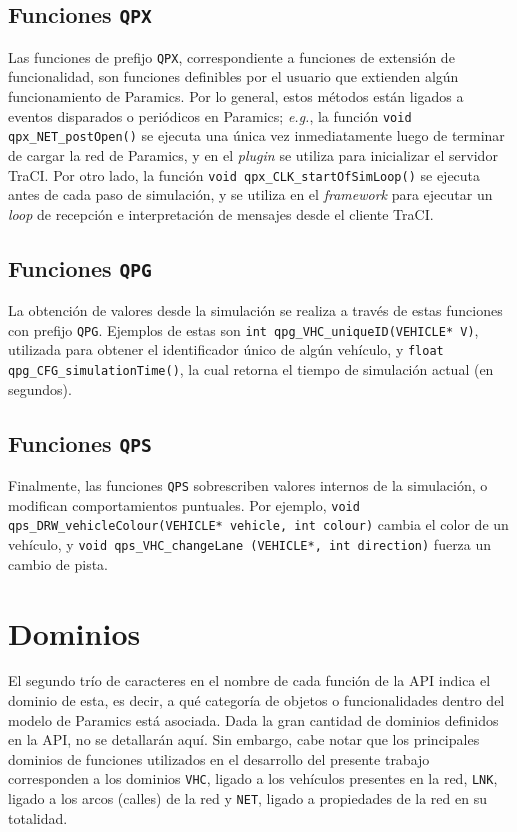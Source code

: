 \subsection{Funciones \texttt{QPX}}

Las funciones de prefijo \texttt{QPX}, correspondiente a funciones de extensión de funcionalidad, son funciones definibles por el usuario que extienden algún funcionamiento de Paramics. Por lo general, estos métodos están ligados a eventos disparados o periódicos en Paramics; \emph{e.g.}, la función \texttt{void qpx\_NET\_postOpen()} se ejecuta una única vez inmediatamente luego de terminar de cargar la red de Paramics, y en el \emph{plugin} se utiliza para inicializar el servidor TraCI. Por otro lado, la función \texttt{void qpx\_CLK\_startOfSimLoop()} se ejecuta antes de cada paso de simulación, y se utiliza en el \emph{framework} para ejecutar un \emph{loop} de recepción e interpretación de mensajes desde el cliente TraCI.

\subsection{Funciones \texttt{QPG}}

La obtención de valores desde la simulación se realiza a través de estas funciones con prefijo \texttt{QPG}. Ejemplos de estas son \texttt{int qpg\_VHC\_uniqueID(VEHICLE* V)}, utilizada para obtener el identificador único de algún vehículo, y \texttt{float qpg\_CFG\_simulationTime()}, la cual retorna el tiempo de simulación actual (en segundos).

\subsection{Funciones \texttt{QPS}}

Finalmente, las funciones \texttt{QPS} sobrescriben valores internos de la simulación, o modifican comportamientos puntuales. Por ejemplo, \texttt{void qps\_DRW\_vehicleColour(VEHICLE* vehicle, int colour)} cambia el color de un vehículo, y \texttt{void qps\_VHC\_changeLane (VEHICLE*, int direction)} fuerza un cambio de pista.
\newpage
\section{Dominios}

El segundo trío de caracteres en el nombre de cada función de la API indica el dominio de esta, es decir, a qué categoría de objetos o funcionalidades dentro del modelo de Paramics está asociada. Dada la gran cantidad de dominios definidos en la API, no se detallarán aquí. Sin embargo, cabe notar que los principales dominios de funciones utilizados en el desarrollo del presente trabajo corresponden a los dominios \texttt{VHC}, ligado a los vehículos presentes en la red, \texttt{LNK}, ligado a los arcos (calles) de la red y \texttt{NET}, ligado a propiedades de la red en su totalidad.